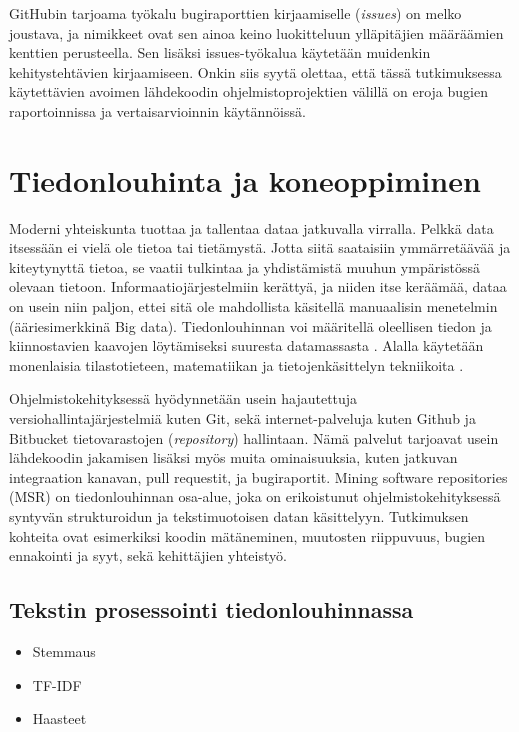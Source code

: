\documentclass[utf8]{gradu3}
\begin{document}
GitHubin tarjoama työkalu bugiraporttien kirjaamiselle (\textit{issues}) on
melko joustava, ja nimikkeet ovat sen ainoa keino luokitteluun ylläpitäjien
määräämien kenttien perusteella. Sen lisäksi issues-työkalua käytetään muidenkin
kehitystehtävien kirjaamiseen.  Onkin siis syytä olettaa, että tässä
tutkimuksessa käytettävien avoimen lähdekoodin ohjelmistoprojektien välillä on
eroja bugien raportoinnissa ja vertaisarvioinnin käytännöissä.

\chapter{Tiedonlouhinta ja koneoppiminen}

Moderni yhteiskunta tuottaa ja tallentaa dataa jatkuvalla virralla. Pelkkä data
itsessään ei vielä ole tietoa tai tietämystä. Jotta siitä saataisiin
ymmärretäävää ja kiteytynyttä tietoa, se vaatii tulkintaa ja yhdistämistä muuhun
ympäristössä olevaan tietoon. %
Informaatiojärjestelmiin kerättyä, ja niiden itse keräämää, dataa on usein niin
paljon, ettei sitä ole mahdollista käsitellä manuaalisin menetelmin
(ääriesimerkkinä Big data). Tiedonlouhinnan voi määritellä oleellisen tiedon ja
kiinnostavien kaavojen löytämiseksi suuresta datamassasta
\parencite[][8]{han-data_mining}. Alalla käytetään monenlaisia tilastotieteen,
matematiikan ja tietojenkäsittelyn tekniikoita \parencite{clifton-2019}.

Ohjelmistokehityksessä hyödynnetään usein hajautettuja
versiohallintajärjestelmiä kuten Git, sekä internet-palveluja kuten Github ja
Bitbucket tietovarastojen (\textit{repository}) hallintaan. Nämä palvelut
tarjoavat usein lähdekoodin jakamisen lisäksi myös muita ominaisuuksia, kuten
jatkuvan integraation kanavan, pull requestit, ja bugiraportit. Mining software
repositories (MSR) on tiedonlouhinnan osa-alue, joka on erikoistunut
ohjelmistokehityksessä syntyvän strukturoidun ja tekstimuotoisen datan
käsittelyyn. Tutkimuksen kohteita ovat esimerkiksi koodin mätäneminen, muutosten
riippuvuus, bugien ennakointi ja syyt, sekä kehittäjien yhteistyö.
\parencite{guemes-pena-emerging_topics}

\section{Tekstin prosessointi tiedonlouhinnassa}
\begin{itemize}
  \item Stemmaus
  \item TF-IDF
  \item Haasteet
\end{itemize}
\end{document}
